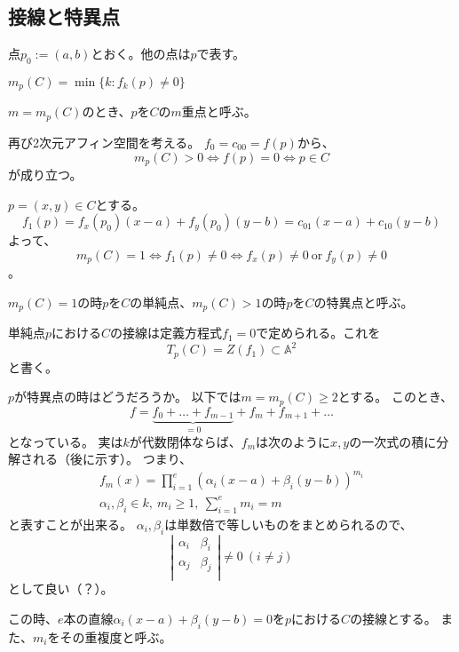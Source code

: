 \documentclass[a4]{article}
\newcommand{\affine}[1]{\mathbb{#1}}
\begin{document}
        \subsection{接線と特異点}
        点$p_0:=(a,b)$とおく。他の点は$p$で表す。
        \begin{Def}[$C$の$p$に於ける重複度]
            $m_p(C)=\min\{k : f_k(p) \neq 0\}$
        \end{Def}
        $m=m_p(C)$のとき、$p$を$C$の$m$重点と呼ぶ。

        再び2次元アフィン空間を考える。
        $f_0=c_{00}=f(p)$から、
        \[ m_p(C)>0 \iff f(p)=0 \iff p \in C \]
        が成り立つ。

        $p=(x,y) \in C$とする。
        \[f_1(p)=f_x(p_0)(x-a)+f_y(p_0)(y-b)=c_{01}(x-a)+c_{10}(y-b)\]
        よって、
        \[ m_p(C)=1 \iff f_1(p) \neq 0 \iff f_x(p) \neq 0~\mathrm{or}~f_y(p) \neq 0 \]。

        \begin{Def}[単純点と特異点]
            $m_p(C)=1$の時$p$を$C$の単純点、$m_p(C) > 1$の時$p$を$C$の特異点と呼ぶ。
        \end{Def}
        単純点$p$における$C$の接線は定義方程式$f_1=0$で定められる。これを
        \[ T_p(C)=Z(f_1) \subset \affine{A}^2 \]
        と書く。

        $p$が特異点の時はどうだろうか。
        以下では$m=m_p(C) \geq 2$とする。
        このとき、
        \[ f=\underbrace{f_0+\dots +f_{m-1}}_{=0}+f_m+f_{m+1}+\dots \]
        となっている。
        実は$k$が代数閉体ならば、$f_m$は次のように$x,y$の一次式の積に分解される（後に示す）。
        つまり、
        \begin{gather*}
            f_m(x)=\prod^{e}_{i=1} (\alpha_{i}(x-a)+\beta_{i}(y-b))^{m_{i}} \\
            \alpha_{i},\beta_{i} \in k,~ m_i \geq 1,~ \sum^e_{i=1}{m_i}=m
        \end{gather*}
        と表すことが出来る。
        $\alpha_i, \beta_i$は単数倍で等しいものをまとめられるので、
        \[
             \left|
            \begin{array}{cc}
                \alpha_i & \beta_i \\
                \alpha_j & \beta_j \\
            \end{array}
            \right|
            \neq 0
            ~(i \neq j)
        \]
        として良い（？）。

        この時、$e$本の直線$\alpha_{i}(x-a)+\beta_{i}(y-b)=0$を$p$における$C$の接線とする。
        また、$m_i$をその重複度と呼ぶ。
\end{document}
